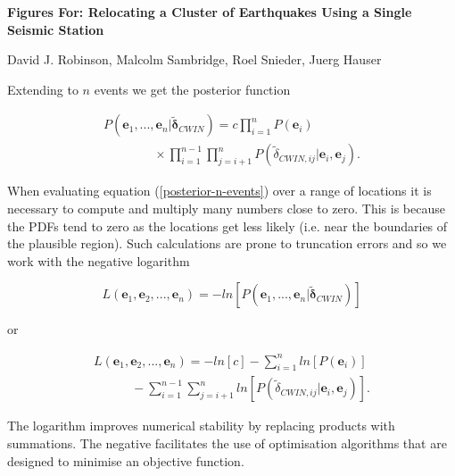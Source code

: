 \documentclass[12pt,double]{article}
\begin{document}
\begin{centering}
\LARGE{\textbf{Figures For: Relocating a Cluster of Earthquakes Using a Single Seismic Station}} \\  
\end{centering}
\vspace{3em}
\begin{centering}
David J. Robinson, Malcolm Sambridge, Roel Snieder, Juerg Hauser \\
\end{centering}


Extending to $n$ events we get the posterior function
\begin{linenomath*} \begin{equation}
\begin{array}{l}
\label{posterior-n-events}
P(\mathbf{e}_1,...,\mathbf{e}_n | \widetilde{\mathbf{\delta}}_{CWIN}) = c \displaystyle \prod_{i=1}^n P(\mathbf{e}_i) \\
\hspace{4em} \displaystyle  \times \prod_{i=1}^{n-1} \prod_{j=i+1}^n P(\widetilde{\delta}_{CWIN,ij}|\mathbf{e}_i,\mathbf{e}_j).
\end{array}
\end{equation} \end{linenomath*}
When evaluating equation (\ref{posterior-n-events})
over a range of locations it is necessary to compute and multiply
many numbers close to zero. This is because the PDFs tend to zero as
the locations get less likely (i.e. near the boundaries of the
plausible region). Such calculations are prone to truncation errors
and so we work with the negative logarithm
\begin{linenomath*} \begin{equation}
\label{eq:-negative-log-part1}
L(\mathbf{e}_1, \mathbf{e}_2, ..., \mathbf{e}_n) = -ln\left[ P(\mathbf{e}_1,...,\mathbf{e}_n | \widetilde{\mathbf{\delta}}_{CWIN} )  \right]
\end{equation} \end{linenomath*}
or
\begin{linenomath*} \begin{equation}
\begin{array}{l}
\label{eq:-negative-log}
L(\mathbf{e}_1, \mathbf{e}_2, ..., \mathbf{e}_n) =
-ln\left[ c \right] - \displaystyle \sum_{i=1}^n ln\left[P(\mathbf{e}_i)\right] \\
\hspace{3em} - \displaystyle \sum_{i=1}^{n-1} \sum_{j=i+1}^n ln\left[P(\widetilde{\delta}_{CWIN,ij}|\mathbf{e}_i,\mathbf{e}_j)\right].
\end{array}
\end{equation} \end{linenomath*}
The logarithm improves numerical stability by replacing products
with summations. The negative facilitates the use of optimisation
algorithms that are designed to minimise an objective function.
\end{document}

